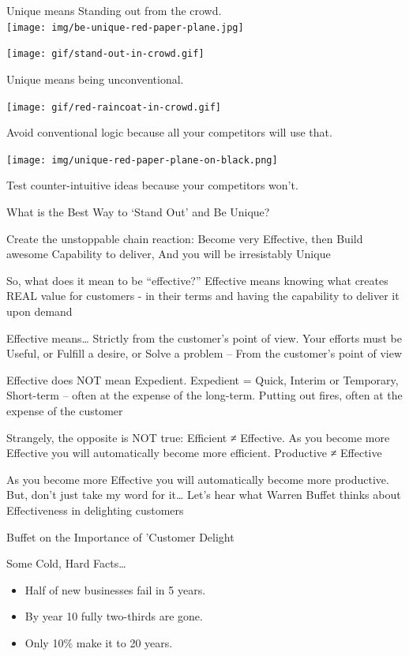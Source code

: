 \documentclass[
]{book}
\providecommand{\tightlist}{%
  \setlength{\itemsep}{0pt}\setlength{\parskip}{0pt}}
\begin{document}
Unique means Standing out from the crowd.\\

\texttt{[image: img/be-unique-red-paper-plane.jpg]}

\texttt{[image: gif/stand-out-in-crowd.gif]}

Unique means being unconventional.

\texttt{[image: gif/red-raincoat-in-crowd.gif]}

Avoid conventional logic because all your competitors will use that.

\texttt{[image: img/unique-red-paper-plane-on-black.png]}

Test counter-intuitive ideas because your competitors won't.

What is the Best Way to `Stand Out' and Be Unique?

Create the unstoppable chain reaction: Become very Effective, then Build awesome Capability to deliver, And you will be irresistably Unique

So, what does it mean to be ``effective?'' Effective means knowing what creates REAL value for customers - in their terms and having the capability to deliver it upon demand

Effective means\ldots{} Strictly from the customer's point of view. Your efforts must be Useful, or Fulfill a desire, or Solve a problem -- From the customer's point of view

Effective does NOT mean Expedient. Expedient = Quick, Interim or Temporary, Short-term -- often at the expense of the long-term. Putting out fires, often at the expense of the customer

Strangely, the opposite is NOT true: Efficient ≠ Effective. As you become more Effective you will automatically become more efficient.
Productive ≠ Effective

As you become more Effective you will automatically become more productive. But, don't just take my word for it\ldots{} Let's hear what Warren Buffet thinks about Effectiveness in delighting customers

Buffet on the Importance of 'Customer Delight

Some Cold, Hard Facts\ldots{}

\begin{itemize}
\tightlist
\item
  Half of new businesses fail in 5 years.
\item
  By year 10 fully two-thirds are gone.
\item
  Only 10\% make it to 20 years.
\end{itemize}
\end{document}
